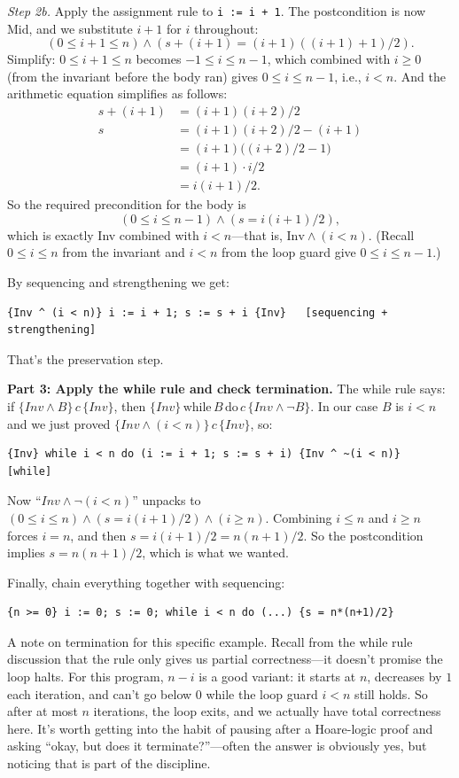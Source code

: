 \documentclass[11pt]{article}
\begin{document}
\emph{Step 2b.} Apply the assignment rule to \texttt{i := i + 1}. The postcondition is now Mid, and we substitute $i + 1$ for $i$ throughout:
\[
  (0 \leq i + 1 \leq n) \wedge (s + (i + 1) = (i+1)((i+1)+1)/2).
\]
Simplify: $0 \leq i + 1 \leq n$ becomes $-1 \leq i \leq n - 1$, which combined with $i \geq 0$ (from the invariant before the body ran) gives $0 \leq i \leq n - 1$, i.e., $i < n$. And the arithmetic equation simplifies as follows:
\begin{align*}
  s + (i + 1) &= (i+1)(i+2)/2 \\
  s &= (i+1)(i+2)/2 - (i + 1) \\
    &= (i+1)\bigl((i+2)/2 - 1\bigr) \\
    &= (i+1) \cdot i / 2 \\
    &= i(i+1)/2.
\end{align*}
So the required precondition for the body is
\[
  (0 \leq i \leq n - 1) \wedge (s = i(i+1)/2),
\]
which is exactly Inv combined with $i < n$---that is, $\text{Inv} \wedge (i < n)$. (Recall $0 \leq i \leq n$ from the invariant and $i < n$ from the loop guard give $0 \leq i \leq n - 1$.) \checkmark

By sequencing and strengthening we get:
\begin{lstlisting}
{Inv ^ (i < n)} i := i + 1; s := s + i {Inv}   [sequencing + strengthening]
\end{lstlisting}
That's the preservation step.

\textbf{Part 3: Apply the while rule and check termination.} The while rule says: if $\{Inv \wedge B\}\, c\, \{Inv\}$, then $\{Inv\}\, \text{while}\, B\, \text{do}\, c\, \{Inv \wedge \neg B\}$. In our case $B$ is $i < n$ and we just proved $\{Inv \wedge (i < n)\}\, c\, \{Inv\}$, so:
\begin{lstlisting}
{Inv} while i < n do (i := i + 1; s := s + i) {Inv ^ ~(i < n)}     [while]
\end{lstlisting}
Now ``$Inv \wedge \neg(i < n)$'' unpacks to $(0 \leq i \leq n) \wedge (s = i(i+1)/2) \wedge (i \geq n)$. Combining $i \leq n$ and $i \geq n$ forces $i = n$, and then $s = i(i+1)/2 = n(n+1)/2$. So the postcondition implies $s = n(n+1)/2$, which is what we wanted.

Finally, chain everything together with sequencing:
\begin{lstlisting}
{n >= 0} i := 0; s := 0; while i < n do (...) {s = n*(n+1)/2}
\end{lstlisting}

A note on termination for this specific example. Recall from the while rule discussion that the rule only gives us partial correctness---it doesn't promise the loop halts. For this program, $n - i$ is a good variant: it starts at $n$, decreases by $1$ each iteration, and can't go below $0$ while the loop guard $i < n$ still holds. So after at most $n$ iterations, the loop exits, and we actually have total correctness here. It's worth getting into the habit of pausing after a Hoare-logic proof and asking ``okay, but does it terminate?''---often the answer is obviously yes, but noticing that is part of the discipline.
\end{document}

